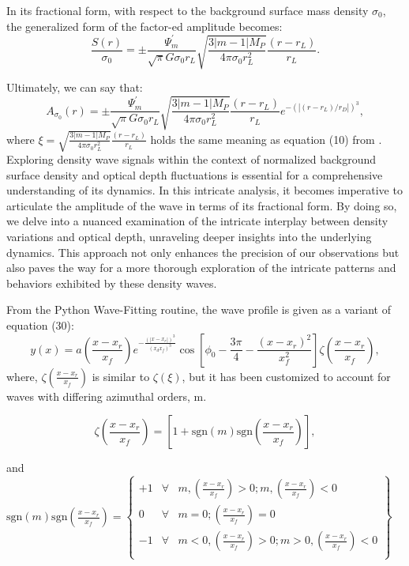 \documentclass{article}
\begin{document}
In its fractional form, with respect to the background surface mass density $\sigma_{0}$, the generalized form of the factor-ed amplitude becomes:
\begin{equation}
   \frac{S(r)}{\sigma_{0}} = \pm \frac{\Psi_{m}^{'}}{\sqrt{\pi}G\sigma_{0} r_{L}} \sqrt{\frac{3|m - 1|M_{P}}{4 \pi \sigma_{0}r_{L}^{2}}} \frac{(r - r_{L})}{r_{L}}.
\end{equation}

Ultimately, we can say that:
\begin{equation}
  A_{\sigma_{0}}(r) = \pm \frac{\Psi_{m}^{'}}{\sqrt{\pi}G\sigma_{0} r_{L}} \sqrt{\frac{3|m - 1|M_{P}}{4 \pi \sigma_{0}r_{L}^{2}}} \frac{(r - r_{L})}{r_{L}}e^{-(|(r - r_{L})/r_{D}|)^{3}},
\end{equation}
where $\xi = \sqrt{\frac{3|m - 1|M_{P}}{4 \pi \sigma_{0}r_{L}^{2}}}\frac{(r - r_{L})}{r_{L}}$ holds the same meaning as equation (10) from \cite{Nicholson1990AnAR}. Exploring density wave signals within the context of normalized background surface density and optical depth fluctuations is essential for a comprehensive understanding of its dynamics. In this intricate analysis, it becomes imperative to articulate the amplitude of the wave in terms of its fractional form. By doing so, we delve into a nuanced examination of the intricate interplay between density variations and optical depth, unraveling deeper insights into the underlying dynamics. This approach not only enhances the precision of our observations but also paves the way for a more thorough exploration of the intricate patterns and behaviors exhibited by these density waves.


From the Python Wave-Fitting routine, the wave profile is given as a variant of equation (30):
\begin{equation}
    y(x) = a(\frac{x-x_{r}}{x_{f}})e^{-\frac{(|x-x_{r}|)^{3}}{(x_{d}x_{f})^{3}}}\cos\left[\phi_{0} - \frac{3\pi}{4} - \frac{{(x-x_{r})^2}}{{x_{f}^{2}}}\right]\zeta(\frac{x-x_{r}}{x_{f}}), 
\end{equation}
where,  $\zeta(\frac{x-x_{r}}{x_{f}})$ is similar to  $\zeta(\xi)$, but it has been customized to account for waves with differing azimuthal orders, m.            

\begin{equation}
\zeta(\frac{x-x_{r}}{x_{f}}) = [1 + \mathrm{sgn}(m) \mathrm{sgn}(\frac{x-x_{r}}{x_{f}})],
\end{equation}

and $\mathrm{sgn}(m) \mathrm{sgn}(\frac{x-x_{r}}{x_{f}}) = \left\{ \begin{array}{rcl}
+1 & \forall & m, (\frac{x-x_{r}}{x_{f}}) >0;  m, (\frac{x-x_{r}}{x_{f}}) <0  \\ 0 & \forall & m =0; (\frac{x-x_{r}}{x_{f}}) = 0 \\ -1 & \forall & m<0, (\frac{x-x_{r}}{x_{f}}) >0; m>0, (\frac{x-x_{r}}{x_{f}}) <0 \\ 
\end{array} \right\}$
\end{document}
